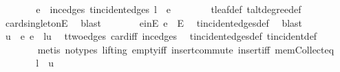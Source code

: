\begin{isabellebody}
\ \ \ \ \isamarkupfalse%
\ \isamarkupfalse%
\ e\ \ inc{\isacharunderscore}{\kern0pt}edges{\isacharcolon}{\kern0pt}\ {\isachardoublequoteopen}t{\isachardot}{\kern0pt}incident{\isacharunderscore}{\kern0pt}edges\ l\ {\isacharequal}{\kern0pt}\ {\isacharbraceleft}{\kern0pt}e{\isacharbraceright}{\kern0pt}{\isachardoublequoteclose}\isanewline
\ \ \ \ \ \ \isamarkupfalse%
\ t{\isachardot}{\kern0pt}leaf{\isacharunderscore}{\kern0pt}def\ t{\isachardot}{\kern0pt}alt{\isacharunderscore}{\kern0pt}degree{\isacharunderscore}{\kern0pt}def\ \isamarkupfalse%
\ card{\isacharunderscore}{\kern0pt}{}{\isacharunderscore}{\kern0pt}singletonE\ \isamarkupfalse%
\ blast\isanewline
\ \ \ \ \isamarkupfalse%
\ \isamarkupfalse%
\ e{\isacharunderscore}{\kern0pt}in{\isacharunderscore}{\kern0pt}E{\isacharcolon}{\kern0pt}\ {\isachardoublequoteopen}e\ {\isasymin}\ E{\isachardoublequoteclose}\ \isamarkupfalse%
\ t{\isachardot}{\kern0pt}incident{\isacharunderscore}{\kern0pt}edges{\isacharunderscore}{\kern0pt}def\ \isamarkupfalse%
\ blast\isanewline
\ \ \ \ \isamarkupfalse%
\ \isamarkupfalse%
\ u\ \ e{\isacharcolon}{\kern0pt}\ {\isachardoublequoteopen}e\ {\isacharequal}{\kern0pt}\ {\isacharbraceleft}{\kern0pt}l{\isacharcomma}{\kern0pt}u{\isacharbraceright}{\kern0pt}{\isachardoublequoteclose}\ \isamarkupfalse%
\ t{\isachardot}{\kern0pt}two{\isacharunderscore}{\kern0pt}edges\ card{\isacharunderscore}{\kern0pt}{}{\isacharunderscore}{\kern0pt}iff\ inc{\isacharunderscore}{\kern0pt}edges\ \isamarkupfalse%
\ t{\isachardot}{\kern0pt}incident{\isacharunderscore}{\kern0pt}edges{\isacharunderscore}{\kern0pt}def\ t{\isachardot}{\kern0pt}incident{\isacharunderscore}{\kern0pt}def\isanewline
\ \ \ \ \ \ \isamarkupfalse%
\ {\isacharparenleft}{\kern0pt}metis\ {\isacharparenleft}{\kern0pt}no{\isacharunderscore}{\kern0pt}types{\isacharcomma}{\kern0pt}\ lifting{\isacharparenright}{\kern0pt}\ empty{\isacharunderscore}{\kern0pt}iff\ insert{\isacharunderscore}{\kern0pt}commute\ insert{\isacharunderscore}{\kern0pt}iff\ mem{\isacharunderscore}{\kern0pt}Collect{\isacharunderscore}{\kern0pt}eq{\isacharparenright}{\kern0pt}\isanewline
\ \ \ \ \isamarkupfalse%
\ \isamarkupfalse%
\ {\isachardoublequoteopen}l\ {\isasymnoteq}\ u{\isachardoublequoteclose}\ \isamarkupfalse%

\end{isabellebody}
